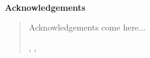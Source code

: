 
\newpage
\setcounter{page}{0}
\thispagestyle{empty}

~

\begin{center}
	\sffamily\bfseries\large Acknowledgements
\end{center}

\begin{quote}
\vspace{.1cm}

Acknowledgements come here...

\begin{flushright}
	\myplace, \@date, \@author
\end{flushright}

\end{quote}
 
\begin{center}
	\sffamily\large \phantom{Acknowledgements}
\end{center}

~

\newpage